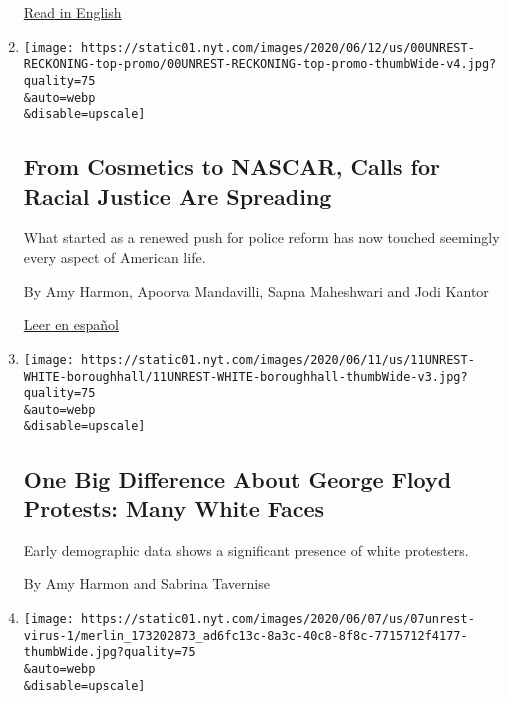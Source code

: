 \begin{enumerate}
  \href{https://www.nytimes.com/2020/06/13/us/george-floyd-racism-america.html}{Read
  in English}
\item
  \href{/2020/06/13/us/george-floyd-racism-america.html}{}

  \texttt{[image: https://static01.nyt.com/images/2020/06/12/us/00UNREST-RECKONING-top-promo/00UNREST-RECKONING-top-promo-thumbWide-v4.jpg?quality=75\\\&auto=webp\\\&disable=upscale]}

  \hypertarget{from-cosmetics-to-nascar-calls-for-racial-justice-are-spreading}{%
  \subsection{From Cosmetics to NASCAR, Calls for Racial Justice Are
  Spreading}\label{from-cosmetics-to-nascar-calls-for-racial-justice-are-spreading}}

  What started as a renewed push for police reform has now touched
  seemingly every aspect of American life.

  By Amy Harmon, Apoorva Mandavilli, Sapna Maheshwari and Jodi Kantor

  \href{https://www.nytimes.com/es/2020/06/15/espanol/mundo/racismo-george-floyd-protestas.html}{Leer
  en español}
\item
  \href{/2020/06/12/us/george-floyd-white-protesters.html}{}

  \texttt{[image: https://static01.nyt.com/images/2020/06/11/us/11UNREST-WHITE-boroughhall/11UNREST-WHITE-boroughhall-thumbWide-v3.jpg?quality=75\\\&auto=webp\\\&disable=upscale]}

  \hypertarget{one-big-difference-about-george-floyd-protests-many-white-faces}{%
  \subsection{One Big Difference About George Floyd Protests: Many White
  Faces}\label{one-big-difference-about-george-floyd-protests-many-white-faces}}

  Early demographic data shows a significant presence of white
  protesters.

  By Amy Harmon and Sabrina Tavernise
\item
  \href{/2020/06/07/us/Protest-coronavirus-george-floyd.html}{}

  \texttt{[image: https://static01.nyt.com/images/2020/06/07/us/07unrest-virus-1/merlin\_173202873\_ad6fc13c-8a3c-40c8-8f8c-7715712f4177-thumbWide.jpg?quality=75\\\&auto=webp\\\&disable=upscale]}


\end{enumerate}
